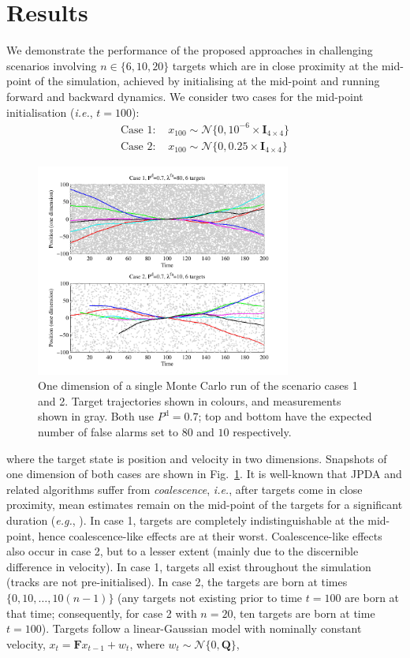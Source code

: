 \documentclass[journal,twoside]{IEEEtran}
\theoremstyle{plain}
\begin{document}
\section{Results}
\label{sec:Results}
%
We demonstrate the performance of the proposed approaches in challenging scenarios involving $n\in\{6,10,20\}$ targets which are in close proximity at the mid-point of the simulation, achieved by initialising at the mid-point and running forward and backward dynamics. We consider two cases for the mid-point initialisation (\textit{i.e.}\xspace, $t=100$):
%
\begin{align*}
\mbox{Case 1: } & x_{100} \sim \mathcal{N}\{0,10^{-6}\times\mathbf{I}_{4\times 4}\} \\
\mbox{Case 2: } & x_{100} \sim \mathcal{N}\{0,0.25\times\mathbf{I}_{4\times 4}\} 
\end{align*}
%
\begin{figure}[tb]
\centering
\includegraphics[width=3.3in]{figure4.pdf}
\vspace{-6pt}
\caption{One dimension of a single Monte Carlo run of the scenario cases 1 and 2. Target trajectories shown in colours, and measurements shown in gray. Both use $P^{\mathrm{d}}=0.7$; top and bottom have the expected number of false alarms set to $80$ and $10$ respectively.}
\label{fig:Scenario}
\vspace{-12pt}
\end{figure}%
%
where the target state is position and velocity in two dimensions. Snapshots of one dimension of both cases are shown in Fig.~\ref{fig:Scenario}. It is well-known that JPDA and related algorithms suffer from \emph{coalescence}, \textit{i.e.}\xspace, after targets come in close proximity, mean estimates remain on the mid-point of the targets for a significant duration (\textit{e.g.}\xspace, \cite{BloBlo00}). In case 1, targets are completely indistinguishable at the mid-point, hence coalescence-like effects are at their worst. Coalescence-like effects also occur in case 2, but to a lesser extent (mainly due to the discernible difference in velocity). In case 1, targets all exist throughout the simulation (tracks are not pre-initialised). In case 2, the  targets are born at times $\{0,10,\dots,10 (n-1)\}$ (any targets not existing prior to time $t=100$ are born at that time; consequently, for case 2 with $n=20$, ten targets are born at time $t=100$). Targets follow a linear-Gaussian model with nominally constant velocity, $x_t = \mathbf{F} x_{t-1} + w_t$, where $w_t\sim\mathcal{N}\{0,\mathbf{Q}\}$, 
\end{document}
